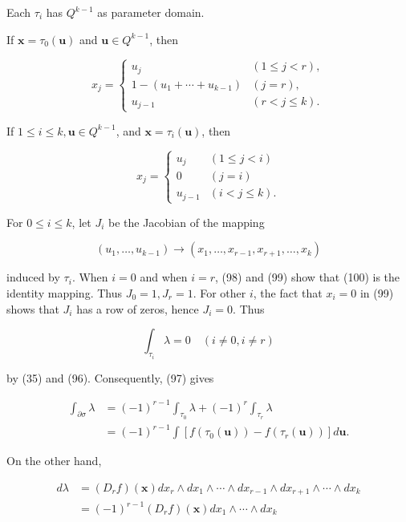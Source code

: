 \documentclass[10pt]{article}
\begin{document}
Each $\tau_{i}$ has $Q^{k-1}$ as parameter domain.

If $\mathbf{x}=\tau_{0}(\mathbf{u})$ and $\mathbf{u} \in Q^{k-1}$, then

$$
x_{j}= \begin{cases}u_{j} & (1 \leq j<r), \\ 1-\left(u_{1}+\cdots+u_{k-1}\right) & (j=r), \\ u_{j-1} & (r<j \leq k) .\end{cases}
$$

If $1 \leq i \leq k, \mathbf{u} \in Q^{k-1}$, and $\mathbf{x}=\tau_{i}(\mathbf{u})$, then

$$
x_{j}= \begin{cases}u_{j} & (1 \leq j<i) \\ 0 & (j=i) \\ u_{j-1} & (i<j \leq k) .\end{cases}
$$

For $0 \leq i \leq k$, let $J_{i}$ be the Jacobian of the mapping

$$
\left(u_{1}, \ldots, u_{k-1}\right) \rightarrow\left(x_{1}, \ldots, x_{r-1}, x_{r+1}, \ldots, x_{k}\right)
$$

induced by $\tau_{i}$. When $i=0$ and when $i=r$, (98) and (99) show that (100) is the identity mapping. Thus $J_{0}=1, J_{r}=1$. For other $i$, the fact that $x_{i}=0$ in (99) shows that $J_{i}$ has a row of zeros, hence $J_{i}=0$. Thus

$$
\int_{\tau_{i}} \lambda=0 \quad(i \neq 0, i \neq r)
$$

by (35) and (96). Consequently, (97) gives

$$
\begin{aligned}
\int_{\partial \sigma} \lambda & =(-1)^{r-1} \int_{\tau_{0}} \lambda+(-1)^{r} \int_{\tau_{r}} \lambda \\
& =(-1)^{r-1} \int\left[f\left(\tau_{0}(\mathbf{u})\right)-f\left(\tau_{r}(\mathbf{u})\right)\right] d \mathbf{u} .
\end{aligned}
$$

On the other hand,

$$
\begin{aligned}
d \lambda & =\left(D_{r} f\right)(\mathbf{x}) d x_{r} \wedge d x_{1} \wedge \cdots \wedge d x_{r-1} \wedge d x_{r+1} \wedge \cdots \wedge d x_{k} \\
& =(-1)^{r-1}\left(D_{r} f\right)(\mathbf{x}) d x_{1} \wedge \cdots \wedge d x_{k}
\end{aligned}
$$
\end{document}

